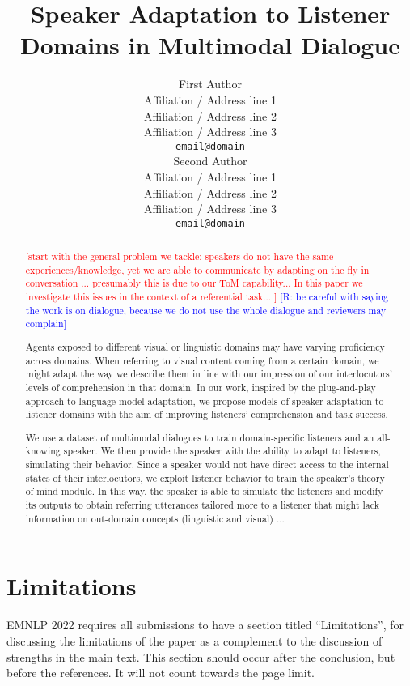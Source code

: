 \documentclass[11pt]{article}
\title{Speaker Adaptation to Listener Domains in Multimodal Dialogue \note{think about the title}}
\author{First Author \\
  Affiliation / Address line 1 \\
  Affiliation / Address line 2 \\
  Affiliation / Address line 3 \\
  \texttt{email@domain} \\\And
  Second Author \\
  Affiliation / Address line 1 \\
  Affiliation / Address line 2 \\
  Affiliation / Address line 3 \\
  \texttt{email@domain} \\}
\newcommand{\raq}[1]{\textcolor{blue}{[R: #1]}}
\newcommand{\note}[1]{\textcolor{red}{[#1]}}
\begin{document}
\maketitle
\begin{abstract}
\note{start with the general problem we tackle: speakers do not have the same experiences/knowledge, yet we are able to communicate by adapting on the fly in conversation ... presumably this is due to our ToM capability... In this paper we investigate this issues in the context of a referential task...  } 
\raq{be careful with saying the work is on dialogue, because we do not use the whole dialogue and reviewers may complain}


Agents exposed to different visual or linguistic domains may have varying proficiency across domains. When referring to visual content coming from a certain domain, we might adapt the way we describe them in line with our impression of our interlocutors' levels of comprehension in that domain. In our work, inspired by the plug-and-play approach to language model adaptation, we propose models of speaker adaptation to listener domains with the aim of improving listeners' comprehension and task success.

 We use a dataset of multimodal dialogues to train domain-specific listeners and an all-knowing speaker. We then provide the speaker with the ability to adapt to listeners, simulating their behavior. Since a speaker would not have direct access to the internal states of their interlocutors, we exploit listener behavior to train the speaker's theory of mind module. In this way, the speaker is able to simulate the listeners and modify its outputs to obtain referring utterances tailored more to a listener that might lack information on out-domain concepts (linguistic and visual) ...

\end{abstract}














\section*{Limitations}
EMNLP 2022 requires all submissions to have a section titled ``Limitations'', for discussing the limitations of the paper as a complement to the discussion of strengths in the main text. This section should occur after the conclusion, but before the references. It will not count towards the page limit.  
\end{document}
